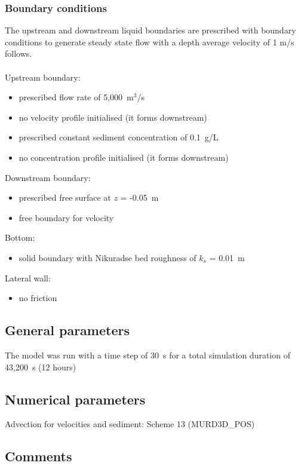 \subsubsection{Boundary conditions}
%
The upstream and downstream liquid boundaries are prescribed with
boundary conditions to generate steady state flow with a depth average velocity of 1 m/s
follows.\\
\\
Upstream boundary:
\begin{itemize}
\item prescribed flow rate of 5,000~m$^3$/s
\item no velocity profile initialised (it forms downstream)
\item prescribed constant sediment concentration of 0.1~g/L
\item no concentration profile initialised (it forms downstream)
\end{itemize}
Downstream boundary:
\begin{itemize}
\item prescribed free surface at $z$ = -0.05~m
\item free boundary for velocity
\end{itemize}
Bottom:
\begin{itemize}
\item
solid boundary with Nikuradse bed roughness of $k_s$ = 0.01~m
\end{itemize}
Lateral wall:
\begin{itemize}
\item no friction
\end{itemize}
%
\subsection{General parameters}
%
The model was run with a time step of 30~s for a total simulation
duration of 43,200~s (12 hours)
%
%
%
\subsection{Numerical parameters}
%
Advection for velocities and sediment: Scheme 13 (MURD3D\_POS)
%
\subsection{Comments}
%
%
%
